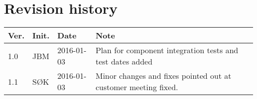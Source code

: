 \chapter*{Revision history}
\label{app:rev_his}

\renewcommand\arraystretch{1.5}
\begin{tabular}{b{1cm} b{1cm} b{2cm} b{8cm}}
    \textbf{Ver.} & \textbf{Init.} & \textbf{Date} & \textbf{Note} \\
    \hline
    1.0 & JBM & 2016-01-03 &  Plan for component integration tests and test dates added \\
    \hline
    1.1 & SØK & 2016-01-03 &  Minor changes and fixes pointed out at customer meeting fixed. 
\end{tabular}
\renewcommand\arraystretch{1}